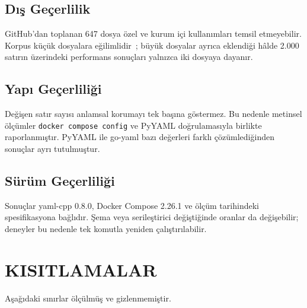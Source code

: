 \documentclass[12pt,a4paper]{article}
\begin{document}
\subsection{Dış Geçerlilik}
GitHub'dan toplanan 647 dosya özel ve kurum içi kullanımları temsil
etmeyebilir. Korpus küçük dosyalara eğilimlidir~\cite{ibrahim2021dockercompose,eng2024patterns};
büyük dosyalar ayrıca eklendiği hâlde 2.000 satırın üzerindeki performans
sonuçları yalnızca iki dosyaya dayanır.

\subsection{Yapı Geçerliliği}
Değişen satır sayısı anlamsal korumayı tek başına göstermez. Bu nedenle
metinsel ölçümler \texttt{docker compose config} ve PyYAML doğrulamasıyla
birlikte raporlanmıştır. PyYAML ile go-yaml bazı değerleri farklı
çözümlediğinden sonuçlar ayrı tutulmuştur.

\subsection{Sürüm Geçerliliği}
Sonuçlar yaml-cpp 0.8.0, Docker Compose 2.26.1 ve ölçüm tarihindeki
spesifikasyona bağlıdır. Şema veya serileştirici değiştiğinde oranlar da
değişebilir; deneyler bu nedenle tek komutla yeniden çalıştırılabilir.

\section{KISITLAMALAR}
\label{sec:kisitlamalar}

Aşağıdaki sınırlar ölçülmüş ve gizlenmemiştir.
\end{document}
